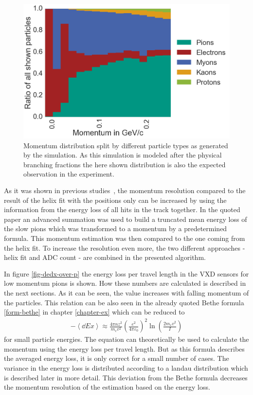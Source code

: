 \begin{figure}
 \centering
 \includegraphics[width=0.8\linewidth]{figures/vxd/momentumDistribution.png}
 \caption[Momentum distribution by different particle types.]{Momentum distribution split by different particle types as generated by the simulation. As this simulation is modeled after the physical branching fractions the here shown distribution is also the expected observation in the experiment.}
 \label{fig-particles-momentum}
\end{figure}

As it was shown in previous studies~\cite{robert}, the momentum resolution compared to the result of the helix fit with the positions only can be increased by using the information from the energy loss of all hits in the track together. In the quoted paper an advanced summation was used to build a truncated mean energy loss of the slow pions which was transformed to a momentum by a predetermined formula. This momentum estimation was then compared to the one coming from the helix fit. To increase the resolution even more, the two different approaches - helix fit and ADC count - are combined in the presented algorithm.

In figure \ref{fig-dedx-over-p} the energy loss per travel length in the VXD sensors for low momentum pions is shown. How these numbers are calculated is described in the next sections. As it can be seen, the \dedx value increases with falling momentum of the particles. This relation can be also seen in the already quoted Bethe formula \ref{form-bethe} in chapter \ref{chapter-ex} which can be reduced to 
\begin{align}
 -\left \langle \dd{E}{x} \right\rangle \approx \frac{4 \pi n z^2}{m_e v^2} \left( \frac{e^2}{4 \pi \varepsilon_0} \right)^2 \ln \left( \frac{2 m_e v^2}{I} \right) \label{form-bethe-simpl}
\end{align}
for small particle energies. The equation can theoretically be used to calculate the momentum using the energy loss per travel length. But as this formula describes the averaged energy loss, it is only correct for a small number of cases. The variance in the energy loss is distributed according to a landau distribution which is described later in more detail. This deviation from the Bethe formula decreases the momentum resolution of the estimation based on the energy loss.

